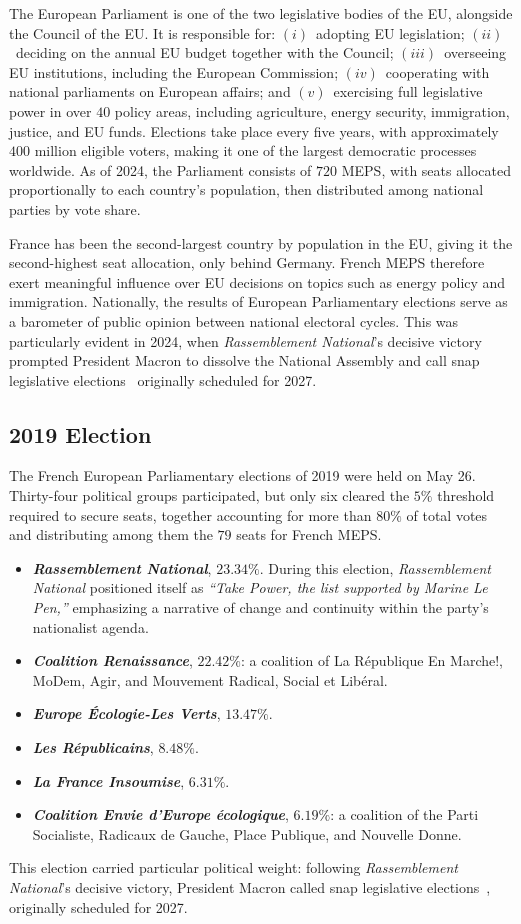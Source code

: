 \documentclass[9pt,sigconf,letterpaper]{acmart}
\newcommand{\RN}{\textsl{Rassemblement National}\xspace}
\newcommand{\LR}{\textsl{Les Républicains}\xspace}
\newcommand{\RENA}{\textsl{Coalition Renaissance}\xspace}
\newcommand{\EEC}{\textsl{Europe Écologie-Les Verts}\xspace}
\newcommand{\LFI}{\textsl{La France Insoumise}\xspace}
\newcommand{\ENVI}{\textsl{Coalition Envie d'Europe écologique}\xspace}
\begin{document}
The European Parliament is one of the two legislative bodies of the \ac{EU}, alongside the Council of the \ac{EU}.
It is responsible for:
$(i)$~adopting \ac{EU} legislation;
$(ii)$~deciding on the annual \ac{EU} budget together with the Council;
$(iii)$~overseeing \ac{EU} institutions, including the European Commission;
$(iv)$~cooperating with national parliaments on European affairs; and
$(v)$~exercising full legislative power in over $40$ policy areas, including agriculture, energy security, immigration, justice, and \ac{EU} funds.
Elections take place every five years, with approximately $400$ million eligible voters, making it one of the largest democratic processes worldwide.
As of 2024, the Parliament consists of $720$ \ac{MEPS}, with seats allocated proportionally to each country's population, then distributed among national parties by vote share.

France has been the second-largest country by population in the \ac{EU}, giving it the second-highest seat allocation, only behind Germany.
French \ac{MEPS} therefore exert meaningful influence over \ac{EU} decisions on topics such as energy policy and immigration.
Nationally, the results of European Parliamentary elections serve as a barometer of public opinion between national electoral cycles.
This was particularly evident in 2024, when \RN's decisive victory prompted President Macron to dissolve the National Assembly and call snap legislative elections~\cite{2024_snap_elections} originally scheduled for 2027.

\subsection*{2019 Election}

The French European Parliamentary elections of 2019 were held on May 26.
Thirty-four political groups participated, but only six cleared the $5\%$ threshold required to secure seats, together accounting for more than $80\%$ of total votes and distributing among them the $79$ seats for French \ac{MEPS}.

\begin{itemize}[noitemsep, topsep=4pt, leftmargin=14pt]
\item \textbf{\RN}, $23.34\%$.
During this election, \RN positioned itself as \textit{``Take Power, the list supported by Marine Le Pen,''} emphasizing a narrative of change and continuity within the party's nationalist agenda.
\item \textbf{\RENA}, $22.42\%$: a coalition of La R\'{e}publique En Marche!, MoDem, Agir, and Mouvement Radical, Social et Lib\'{e}ral.
\item \textbf{\EEC}, $13.47\%$.
\item \textbf{\LR}, $8.48\%$.
\item \textbf{\LFI}, $6.31\%$.
\item \textbf{\ENVI}, $6.19\%$: a coalition of the Parti Socialiste, Radicaux de Gauche, Place Publique, and Nouvelle Donne.
\end{itemize}
This election carried particular political weight: following \RN’s decisive victory, President Macron called snap legislative elections~\cite{2024_snap_elections}, originally scheduled for 2027.
\end{document}
